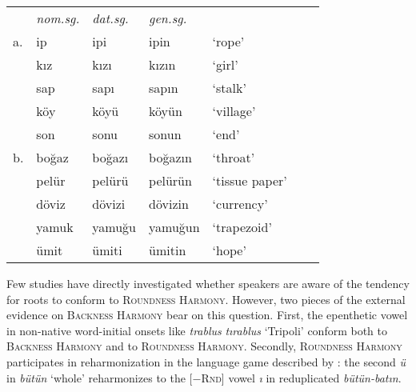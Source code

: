 \begin{example}
\begin{tabular}{l l l l l l@{ }l}
   & \emph{nom.sg.} & \emph{dat.sg.} & \emph{gen.sg.}  \\
a. & {ip}           & {ipi}          & {ipin}         & `rope' & \citep[][216]{Clements1982} \\
   & {kız}          & {kızı}         & {kızın}        & `girl'    \\
   & {sap}          & {sapı}         & {sapın}        & `stalk'   \\
   & {köy}          & {köyü}         & {köyün}        & `village' \\
   & {son}          & {sonu}         & {sonun}        & `end'     \\
b. & {boğaz}        & {boğazı}       & {boğazın}      & `throat'  & \citep{TELL} \\
   & {pelür}        & {pelürü}       & {pelürün}      & `tissue paper' \\
   & {döviz}        & {dövizi}       & {dövizin}      & `currency' \\
   & {yamuk}        & {yamuğu}       & {yamuğun}      & `trapezoid' \\
   & {ümit}         & {ümiti}        & {ümitin}       & `hope'     \\
\end{tabular}
\end{example}

Few studies have directly investigated whether speakers are aware of the tendency for roots to conform to \textsc{Roundness Harmony}. However, two pieces of the external evidence on \textsc{Backness Harmony} bear on this question. First, the epenthetic vowel in non-native word-initial onsets like \emph{trablus} \alt{} \emph{tırablus} `Tripoli' conform both to \textsc{Backness Harmony} and to \textsc{Roundness Harmony}. Secondly, \textsc{Roundness Harmony} participates in reharmonization in the language game described by \citeauthor{Harrison2001}: the second \emph{ü} in \emph{bütün} `whole' reharmonizes to the [$-$\textsc{Rnd}] vowel \emph{ı} in reduplicated \emph{bütün-batın}.

